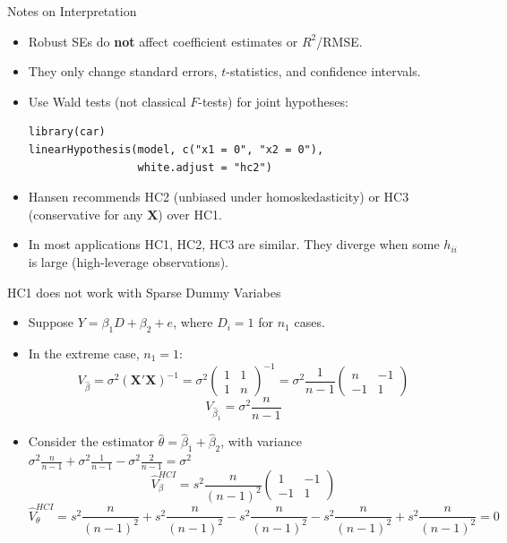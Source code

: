 \documentclass[aspectratio=169, handout, t]{beamer}
\numberwithin{equation}{section}
\begin{document}
\begin{frame}[fragile]{Notes on Interpretation}
\begin{itemize}
\item Robust SEs do \textbf{not} affect coefficient estimates or $R^2$/RMSE.
\item They only change standard errors, $t$-statistics, and confidence intervals. \pause
\item Use Wald tests (not classical $F$-tests) for joint hypotheses:
\begin{lstlisting}
library(car)
linearHypothesis(model, c("x1 = 0", "x2 = 0"),
                 white.adjust = "hc2")
\end{lstlisting}\pause
\item Hansen recommends HC2 (unbiased under homoskedasticity) or HC3 (conservative for any $\bm{X}$) over HC1.
\item In most applications HC1, HC2, HC3 are similar.  They diverge when some $h_{ii}$ is large (high-leverage observations).
\end{itemize}
\end{frame}


\begin{frame}{HC1 does not work with Sparse Dummy Variabes}
\begin{itemize}
\item Suppose $Y=\beta_1D+\beta_2+e$, where $D_i=1$ for $n_1$ cases.
\item In the extreme case, $n_1=1$:
$$V_{\hat{\beta}}=\sigma^2(\bm{X'X})^{-1}=\sigma^2\begin{pmatrix}1&1\\1&n\end{pmatrix}^{-1}=\sigma^2\frac{1}{n-1}\begin{pmatrix}n&-1\\-1&1\end{pmatrix}$$
$$V_{\hat{\beta}_1}=\sigma^2\frac{n}{n-1}$$
\item Consider the estimator $\hat{\theta}=\hat{\beta}_1+\hat{\beta}_2$, with variance $\sigma^2\frac{n}{n-1}+\sigma^2\frac{1}{n-1}-\sigma^2\frac{2}{n-1}=\sigma^2$
$$\hat{V}^{HCI}_\beta=s^2\frac{n}{(n-1)^2}\begin{pmatrix}1&-1\\-1&1\end{pmatrix}$$
$$\hat{V}^{HCI}_\theta=s^2\frac{n}{(n-1)^2}+s^2\frac{n}{(n-1)^2}-s^2\frac{n}{(n-1)^2}-s^2\frac{n}{(n-1)^2}+s^2\frac{n}{(n-1)^2}=0$$
\end{itemize}
\end{frame}
\end{document}

